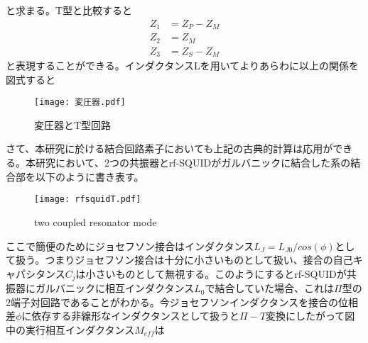 と求まる。T型と比較すると
\begin{eqnarray}
    Z_1 &= Z_P-Z_M\\
    Z_2 &= Z_M\\
    Z_3 &= Z_S-Z_M
\end{eqnarray}
と表現することができる。インダクタンスLを用いてよりあらわに以上の関係を図式すると
\begin{figure}[H]
    \centering
    \texttt{[image: 変圧器.pdf]}
    \caption{変圧器とT型回路}
\end{figure}
さて、本研究に於ける結合回路素子においても上記の古典的計算は応用ができる\cite*{Tian_2008}。本研究において、2つの共振器とrf-SQUIDがガルバニックに結合した系の結合部を以下のように書き表す。
\begin{figure}[H]
    \centering
    \texttt{[image: rfsquidT.pdf]}
    \caption{two coupled resonator mode}
\end{figure}
ここで簡便のためにジョセフソン接合はインダクタンス$L_J = L_{J0}/cos(\phi)$として扱う。つまりジョセフソン接合は十分に小さいものとして扱い、接合の自己キャパシタンス$C_j$は小さいものとして無視する。このようにするとrf-SQUIDが共振器にガルバニックに相互インダクタンス$L_0$で結合していた場合、これは$\Pi$型の2端子対回路であることがわかる。今ジョセフソンインダクタンスを接合の位相差$\phi$に依存する非線形なインダクタンスとして扱うと$\Pi-T$変換にしたがって図中の実行相互インダクタンス$M_{eff}$は


